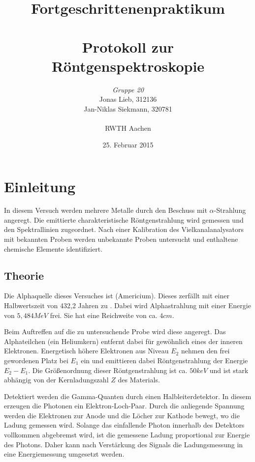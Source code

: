 \documentclass{../Misc/MontavonLaTeX/Montavon}
\date{25. Februar 2015}
\begin{document}
\title{Fortgeschrittenenpraktikum \\ \quad \\ Protokoll zur Röntgenspektroskopie }
\author{\emph{Gruppe 20} \\  Jonas Lieb, 312136 \\ Jan-Niklas Siekmann, 320781 \\ \ \\  RWTH Aachen}
\maketitle
\newpage

\tableofcontents
\newpage

\section{Einleitung}
In diesem Versuch werden mehrere Metalle durch den Beschuss mit $\alpha$-Strahlung angeregt. Die emittierte charakteristische Röntgenstrahlung wird gemessen und den Spektrallinien zugeordnet. Nach einer Kalibration des Vielkanalanalysators mit bekannten Proben werden unbekannte Proben untersucht und enthaltene chemische Elemente identifiziert.

\subsection{Theorie}
Die Alphaquelle dieses Versuches ist  (Americium). Dieses zerfällt mit einer Halbwertszeit von 432,2 Jahren zu . Dabei wird Alphastrahlung mit einer Energie von $5,484 \unit{MeV}$ frei. Sie hat eine Reichweite von ca. $4 \unit{cm}$. 

Beim Auftreffen auf die zu untersuchende Probe wird diese angeregt. Das Alphateilchen (ein Heliumkern) entfernt dabei für gewöhnlich eines der inneren Elektronen. Energetisch höhere Elektronen aus Niveau $E_2$ nehmen den frei gewordenen Platz bei $E_1$ ein und emittieren dabei Röntgenstrahlung der Energie $E_2 - E_1$. Die Größenordnung dieser Röntgenstrahlung ist ca. $50 \unit{keV}$ und ist stark abhängig von der Kernladungszahl $Z$ des Materials.

Detektiert werden die Gamma-Quanten durch einen Halbleiterdetektor. In diesem erzeugen die Photonen ein Elektron-Loch-Paar. Durch die anliegende Spannung werden die Elektronen zur Anode und die Löcher zur Kathode bewegt, wo die Ladung gemessen wird. 
Solange das einfallende Photon innerhalb des Detektors vollkommen abgebremst wird, ist die gemessene Ladung proportional zur Energie des Photons. 
Daher kann nach Verstärkung des Signals die Ladungsmessung in eine Energiemessung umgesetzt werden.
\end{document}
